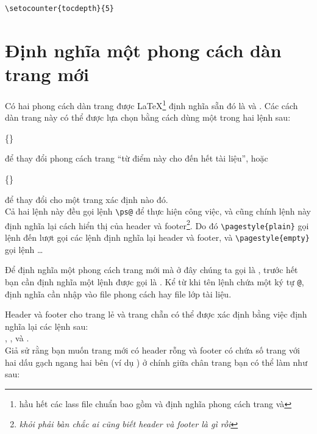 \documentclass[a4paper]{report}
\begin{document}
\begin{verbatim}
\setocounter{tocdepth}{5}
\end{verbatim}



\section{Định nghĩa một phong cách dàn trang mới}
\label{sec:newps}

Có hai phong cách dàn trang được \LaTeX\footnote{ hầu hết các lass file chuẩn bao gồm  và định nghĩa phong cách trang  và } định nghĩa sẵn đó là  và . Các cách dàn trang này có thể được lựa chọn bằng cách dùng một trong hai lệnh sau:

\begin{definition}
\{\}
\end{definition}
để thay đổi phong cách trang  ``từ điểm này cho đến hết tài liệu'', hoặc
\begin{definition}
\{\}
\end{definition}
để thay đổi cho một trang xác định nào đó.\\[1.0ex]

\noindent Cả hai lệnh này đều gọi lệnh \verb|\ps@| để thực hiện công việc, và cũng chính lệnh này định nghĩa lại cách hiển thị của header và footer\footnote{\emph{khỏi phải bàn chắc ai cũng biết header và footer là gì rồi}}. Do đó \verb|\pagestyle{plain}| gọi lệnh   đến lượt gọi các lệnh định nghĩa lại header và footer, và \verb|\pagestyle{empty}| gọi lệnh  \ldots
  
\noindent Để định nghĩa một phong cách trang mới mà ở đây chúng ta gọi là , trước hết bạn cần định nghĩa một lệnh được gọi là . Kể từ khi tên lệnh chứa một ký tự \verb|@|, định nghĩa cần nhập vào file phong cách hay file lớp tài liệu.
  
\noindent Header và footer cho trang lẻ và trang chẵn có thể được xác định bằng việc định nghĩa lại các lệnh sau:\\

, ,  và .\\

\noindent Giả sử rằng bạn muốn trang mới có header rỗng và footer có chứa số trang với hai dấu gạch ngang hai bên (ví dụ  ) ở chính giữa chân trang bạn có thể làm như sau:
\end{document}
